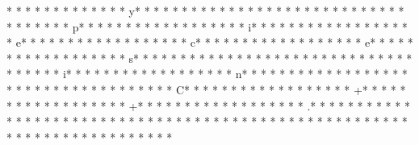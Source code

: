 *  * * *  *  * * *  *  * * *  * y* * *  * * *  * * *  *  * * *  *  * * *  *  * * *  * * *  * * *  *  * * *  *  * * *  * p* * *  * * *  * * *  *  * * *  *  * * *  * i* * *  * * *  * * *  *  * * *  *  * * *  * e* * *  * * *  * * *  *  * * *  *  * * *  * c* * *  * * *  * * *  *  * * *  *  * * *  * e* * *  * * *  * * *  *  * * *  *  * * *  * s* * *  * * *  * * *  *  * * *  *  * * *  *  * * *  * * *  * * *  *  * * *  *  * * *  * i* * *  * * *  * * *  *  * * *  *  * * *  * n* * *  * * *  * * *  *  * * *  *  * * *  *  * * *  * * *  * * *  *  * * *  *  * * *  * C* * *  * * *  * * *  *  * * *  *  * * *  * +* * *  * * *  * * *  *  * * *  *  * * *  * +* * *  * * *  * * *  *  * * *  *  * * *  * .* * *  * * *  * * *  *  * * *  *  * * *  * 
* * *  * * *  * * *  *  * * *  *  * * *  * 	* * *  * * *  * * *  *  * * *  *  * * *  * 	* * *  * * *  * * *  *  * * *  *  * * *  * 
